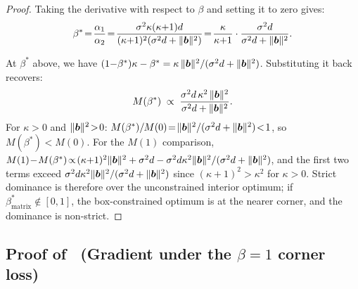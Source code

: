 \begin{appendices}
\begin{proof}
        Taking the derivative with respect to $\beta$ and setting it to zero gives:
        \begin{equation}
            \beta^{\ast}\!=\!\frac{\alpha_{1}}{\alpha_{2}}\!=\!\frac{\sigma^{2}\kappa(\kappa{+}1)d}{(\kappa{+}1)^{2}(\sigma^{2}d+\|{\bm{b}}\|^{2})}\!=\!\frac{\kappa}{\kappa{+}1}\cdot\frac{\sigma^{2}d}{\sigma^{2}d+\|{\bm{b}}\|^{2}}.
        \end{equation}

        At $\beta^{\ast}$ above, we have $(1{-}\beta^{\ast})\kappa - \beta^{\ast} = \kappa\,\|{\bm{b}}\|^{2}/(\sigma^{2}d+\|{\bm{b}}\|^{2})$. Substituting it back recovers:
        \begin{equation*}
            M(\beta^{\ast}) \;\propto\; \frac{\sigma^{2}d\,\kappa^{2}\,\|{\bm{b}}\|^{2}}{\sigma^{2}d+\|{\bm{b}}\|^{2}}.
        \end{equation*}
        For $\kappa\!>\!0$ and $\|{\bm{b}}\|^{2}\!>\!0$: $M(\beta^{\ast})/M(0) \!=\! \|{\bm{b}}\|^{2}/(\sigma^{2}d+\|{\bm{b}}\|^{2}) \!<\! 1$, so $M(\beta^{\ast})\!<\!M(0)$.
        For the $M(1)$ comparison, $M(1)\!-\!M(\beta^{\ast})\!\propto\!(\kappa{+}1)^{2}\|{\bm{b}}\|^{2}+\sigma^{2}d-\sigma^{2}d\kappa^{2}\|{\bm{b}}\|^{2}/(\sigma^{2}d+\|{\bm{b}}\|^{2})$, and the first two terms exceed $\sigma^{2}d\kappa^{2}\|{\bm{b}}\|^{2}/(\sigma^{2}d+\|{\bm{b}}\|^{2})$ since $(\kappa{+}1)^{2}\!>\!\kappa^{2}$ for $\kappa\!>\!0$. Strict dominance is therefore over the unconstrained interior optimum; if $\beta^{\ast}_{\text{matrix}}\!\notin\![0,1]$, the box-constrained optimum is at the nearer corner, and the dominance is non-strict.
    \end{proof}

    \subsection{Proof of~ (Gradient under the $\beta\!=\!1$ corner loss)}



\end{appendices}
